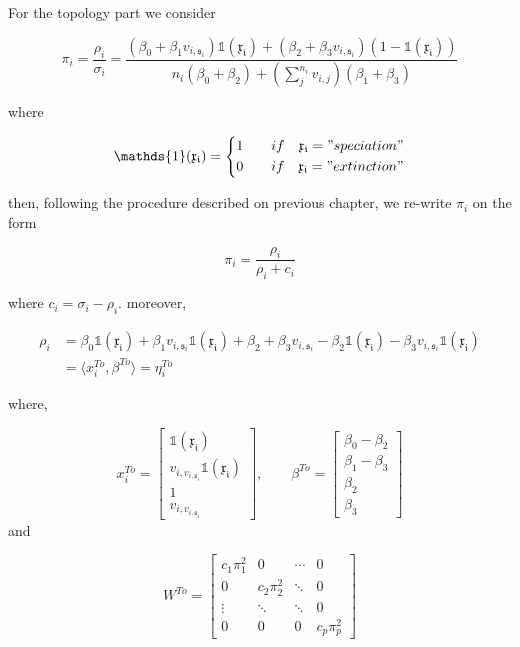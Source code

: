 For the topology part we consider

$$ \pi_i = \frac{\rho_i}{\sigma_i} = \frac{(\beta_0+\beta_1 v_{i,\mathfrak{s}_i})\mathds{1}(\mathfrak{x_i})+(\beta_2+\beta_3v_{i,\mathfrak{s}_i})(1-\mathds{1}(\mathfrak{x_i})) }{n_i(\beta_0+\beta_2)+(\sum_j^{n_i} v_{i,j})(\beta_1+\beta_3)} $$

where

$$ \mathds{1}(\mathfrak{x_i}) =\left\{ \begin{aligned} 1 &\qquad if & \mathfrak{x_i} = "speciation" \\
0 & \qquad if & \mathfrak{x_i} = "extinction" 
 \end{aligned} \right. $$

then, following the procedure described on previous chapter, we re-write $\pi_i$ on the form 

$$ \pi_i = \frac{\rho_i}{\rho_i + c_i} $$

where $c_i = \sigma_i - \rho_i$. moreover, 

$$\begin{aligned} \rho_i & = \beta_0  \mathds{1}(\mathfrak{x_i})  + \beta_1 v_{i,\mathfrak{s}_i}  \mathds{1}(\mathfrak{x_i}) + \beta_2 + \beta_3v_{i,\mathfrak{s}_i} - \beta_2 \mathds{1}(\mathfrak{x_i})-\beta_3v_{i,\mathfrak{s}_i} \mathds{1}(\mathfrak{x_i}) \\
& = \langle x_i^{To},\beta^{To} \rangle = \eta_i^{To} \end{aligned}  $$

where, 

$$ 
 x_i^{To}=
  \begin{bmatrix}
    \mathds{1}(\mathfrak{x_i}) \\
    v_{i,v_{i,\mathfrak{s}_i}}\mathds{1}(\mathfrak{x_i}) \\
    1 \\
    v_{i,v_{i,\mathfrak{s}_i}}
  \end{bmatrix}, \qquad
 \beta^{To} =
 	\begin{bmatrix}
 		\beta_0 - \beta_2 \\
 		\beta_1 - \beta_3 \\
 		\beta_2 \\
 		\beta_3
 	\end{bmatrix}
$$ 
and 


\[
W^{To}=
  \begin{bmatrix}
    c_1\pi_1^2     &      0 & \cdots &  0 \\
     0     &    c_2\pi_2^2 & \ddots &  0 \\
    \vdots & \ddots & \ddots  & 0 \\
     0     &      0 & 0 & c_p\pi_p^2
  \end{bmatrix}
\]

